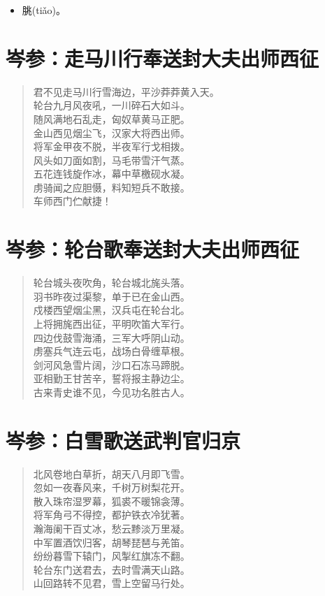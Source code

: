 \documentclass[12pt,oneside]{book}
\newenvironment{shici}{
\begin{verse}
\centering\large\hspace{12pt}}
{\end{verse}}
\begin{document}
\begin{itemize}
\item 朓(tiǎo)。
\end{itemize}


\chapter{岑参：走马川行奉送封大夫出师西征}
\begin{shici}
君不见走马川行雪海边，平沙莽莽黄入天。\\
轮台九月风夜吼，一川碎石大如斗。\\
随风满地石乱走，匈奴草黄马正肥。\\
金山西见烟尘飞，汉家大将西出师。\\
将军金甲夜不脱，半夜军行戈相拨。\\
风头如刀面如割，马毛带雪汗气蒸。\\
五花连钱旋作冰，幕中草檄砚水凝。\\
虏骑闻之应胆慑，料知短兵不敢接。\\
车师西门伫献捷！
\end{shici}

\chapter{岑参：轮台歌奉送封大夫出师西征}
\begin{shici}
轮台城头夜吹角，轮台城北旄头落。\\
羽书昨夜过渠黎，单于已在金山西。\\
戍楼西望烟尘黑，汉兵屯在轮台北。\\
上将拥旄西出征，平明吹笛大军行。\\
四边伐鼓雪海涌，三军大呼阴山动。\\
虏塞兵气连云屯，战场白骨缠草根。\\
剑河风急雪片阔，沙口石冻马蹄脱。\\
亚相勤王甘苦辛，誓将报主静边尘。\\
古来青史谁不见，今见功名胜古人。
\end{shici}

\chapter{岑参：白雪歌送武判官归京}
\begin{shici}
北风卷地白草折，胡天八月即飞雪。\\
忽如一夜春风来，千树万树梨花开。\\
散入珠帘湿罗幕，狐裘不暖锦衾薄。\\
将军角弓不得控，都护铁衣冷犹著。\\
瀚海阑干百丈冰，愁云黪淡万里凝。\\
中军置酒饮归客，胡琴琵琶与羌笛。\\
纷纷暮雪下辕门，风掣红旗冻不翻。\\
轮台东门送君去，去时雪满天山路。\\
山回路转不见君，雪上空留马行处。
\end{shici}
\end{document}
